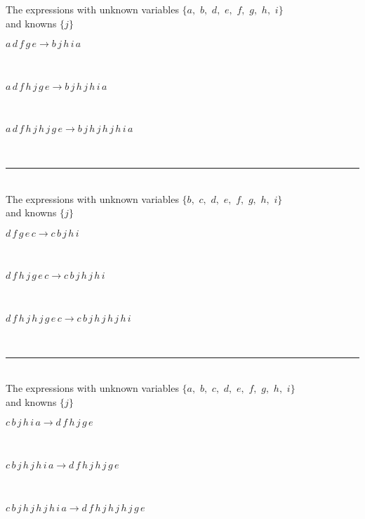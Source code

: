 The expressions with unknown variables $\{a,
$ $
b,
$ $
d,
$ $
e,
$ $
f,
$ $
g,
$ $
h,
$ $
i\}$\\
and knowns $\{j\}$\smallskip\\
\begin{minipage}{6in}
$
a\,
 d\,
 f\,
 g\,
 e\rightarrow b\,
 j\,
 h\,
 i\,
 a
$
\end{minipage}\medskip \\
\begin{minipage}{6in}
$
a\,
 d\,
 f\,
 h\,
 j\,
 g\,
 e\rightarrow b\,
 j\,
 h\,
 j\,
 h\,
 i\,
 a
$
\end{minipage}\medskip \\
\begin{minipage}{6in}
$
a\,
 d\,
 f\,
 h\,
 j\,
 h\,
 j\,
 g\,
 e\rightarrow b\,
 j\,
 h\,
 j\,
 h\,
 j\,
 h\,
 i\,
 a
$
\end{minipage}\\
\rule[3pt]{6in}{.7pt}\\
The expressions with unknown variables $\{b,
$ $
c,
$ $
d,
$ $
e,
$ $
f,
$ $
g,
$ $
h,
$ $
i\}$\\
and knowns $\{j\}$\smallskip\\
\begin{minipage}{6in}
$
d\,
 f\,
 g\,
 e\,
 c\rightarrow c\,
 b\,
 j\,
 h\,
 i
$
\end{minipage}\medskip \\
\begin{minipage}{6in}
$
d\,
 f\,
 h\,
 j\,
 g\,
 e\,
 c\rightarrow c\,
 b\,
 j\,
 h\,
 j\,
 h\,
 i
$
\end{minipage}\medskip \\
\begin{minipage}{6in}
$
d\,
 f\,
 h\,
 j\,
 h\,
 j\,
 g\,
 e\,
 c\rightarrow c\,
 b\,
 j\,
 h\,
 j\,
 h\,
 j\,
 h\,
 i
$
\end{minipage}\\
\rule[3pt]{6in}{.7pt}\\
The expressions with unknown variables $\{a,
$ $
b,
$ $
c,
$ $
d,
$ $
e,
$ $
f,
$ $
g,
$ $
h,
$ $
i\}$\\
and knowns $\{j\}$\smallskip\\
\begin{minipage}{6in}
$
c\,
 b\,
 j\,
 h\,
 i\,
 a\rightarrow d\,
 f\,
 h\,
 j\,
 g\,
 e
$
\end{minipage}\medskip \\
\begin{minipage}{6in}
$
c\,
 b\,
 j\,
 h\,
 j\,
 h\,
 i\,
 a\rightarrow d\,
 f\,
 h\,
 j\,
 h\,
 j\,
 g\,
 e
$
\end{minipage}\medskip \\
\begin{minipage}{6in}
$
c\,
 b\,
 j\,
 h\,
 j\,
 h\,
 j\,
 h\,
 i\,
 a\rightarrow d\,
 f\,
 h\,
 j\,
 h\,
 j\,
 h\,
 j\,
 g\,
 e
$
\end{minipage}\\
\vspace{10pt}

